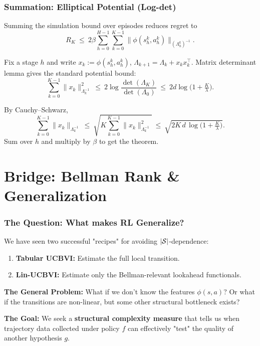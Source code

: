 \documentclass[aspectratio=169]{beamer}
\begin{document}
\begin{frame}\frametitle{Summation: Elliptical Potential (Log-det)}

\small
Summing the simulation bound over episodes reduces regret to
\[
R_K \ \le\ 2\beta\sum_{h=0}^{H-1}\sum_{k=0}^{K-1}\|\phi(s_h^k,a_h^k)\|_{(\Lambda_h^k)^{-1}}.
\]

\vspace{0.10cm}
\pause
Fix a stage $h$ and write $x_k:=\phi(s_h^k,a_h^k)$, $\Lambda_{k+1}=\Lambda_k+x_kx_k^\top$.
Matrix determinant lemma gives the standard potential bound:
\[
\sum_{k=0}^{K-1}\|x_k\|_{\Lambda_k^{-1}}^2
\ \le\ 2\log\frac{\det(\Lambda_K)}{\det(\Lambda_0)}
\ \le\ 2d\log\!\Big(1+\tfrac{K}{\lambda}\Big).
\]

\vspace{0.10cm}
\pause
By Cauchy--Schwarz,
\[
\sum_{k=0}^{K-1}\|x_k\|_{\Lambda_k^{-1}}
\ \le\
\sqrt{K\sum_{k=0}^{K-1}\|x_k\|_{\Lambda_k^{-1}}^2}
\ \le\
\sqrt{2K\,d\,\log\!\Big(1+\tfrac{K}{\lambda}\Big)}.
\]
Sum over $h$ and multiply by $\beta$ to get the theorem.

\end{frame}

\section{Bridge: Bellman Rank \& Generalization}

\begin{frame}\frametitle{The Question: What makes RL Generalize?}

We have seen two successful "recipes" for avoiding $|\mathcal{S}|$-dependence:
\begin{enumerate}
    \item \textbf{Tabular UCBVI:} Estimate the full local transition.
    \item \textbf{Lin-UCBVI:} Estimate only the Bellman-relevant lookahead functionals.
\end{enumerate}

\vspace{0.4cm}
\pause
\textbf{The General Problem:}
What if we don't know the features $\phi(s,a)$? Or what if the transitions are non-linear, but some other structural bottleneck exists?

\vspace{0.4cm}
\pause
\textbf{The Goal:} We seek a \textbf{structural complexity measure} that tells us when trajectory data collected under policy $f$ can effectively "test" the quality of another hypothesis $g$.
\end{frame}
\end{document}
